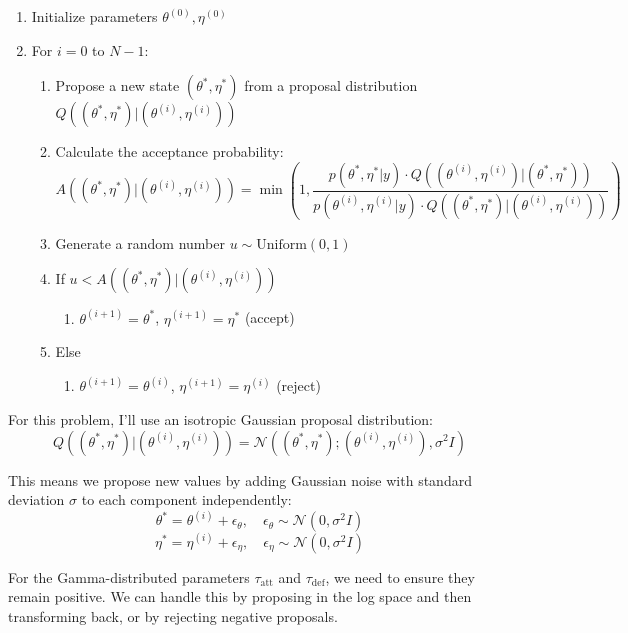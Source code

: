 \documentclass{article}
\begin{document}
\begin{enumerate}
\begin{enumerate}
    \item Initialize parameters $\theta^{(0)}, \eta^{(0)}$
    \item For $i = 0$ to $N-1$:
    \begin{enumerate}
        \item Propose a new state $(\theta^*, \eta^*)$ from a proposal distribution $Q((\theta^*, \eta^*) | (\theta^{(i)}, \eta^{(i)}))$
        \item Calculate the acceptance probability:
        \[
            A((\theta^*, \eta^*) | (\theta^{(i)}, \eta^{(i)})) = \min\left(1, \frac{p(\theta^*, \eta^* | y) \cdot Q((\theta^{(i)}, \eta^{(i)}) | (\theta^*, \eta^*))}{p(\theta^{(i)}, \eta^{(i)} | y) \cdot Q((\theta^*, \eta^*) | (\theta^{(i)}, \eta^{(i)}))}\right)
        \]
        \item Generate a random number $u \sim \text{Uniform}(0, 1)$
        \item If $u < A((\theta^*, \eta^*) | (\theta^{(i)}, \eta^{(i)}))$
        \begin{enumerate}
            \item $\theta^{(i+1)} = \theta^*$, $\eta^{(i+1)} = \eta^*$ (accept)
        \end{enumerate}
        \item Else
        \begin{enumerate}
            \item $\theta^{(i+1)} = \theta^{(i)}$, $\eta^{(i+1)} = \eta^{(i)}$ (reject)
        \end{enumerate}
    \end{enumerate}
\end{enumerate}

For this problem, I'll use an isotropic Gaussian proposal distribution:
\[
Q((\theta^*, \eta^*) | (\theta^{(i)}, \eta^{(i)})) = \mathcal{N}((\theta^*, \eta^*); (\theta^{(i)}, \eta^{(i)}), \sigma^2 I)
\]

This means we propose new values by adding Gaussian noise with standard deviation $\sigma$ to each component independently:
\[
\theta^* = \theta^{(i)} + \epsilon_{\theta}, \quad \epsilon_{\theta} \sim \mathcal{N}(0, \sigma^2 I)
\]
\[
\eta^* = \eta^{(i)} + \epsilon_{\eta}, \quad \epsilon_{\eta} \sim \mathcal{N}(0, \sigma^2 I)
\]

For the Gamma-distributed parameters $\tau_{\text{att}}$ and $\tau_{\text{def}}$, we need to ensure they remain positive. We can handle this by proposing in the log space and then transforming back, or by rejecting negative proposals.


\end{enumerate}
\end{document}
